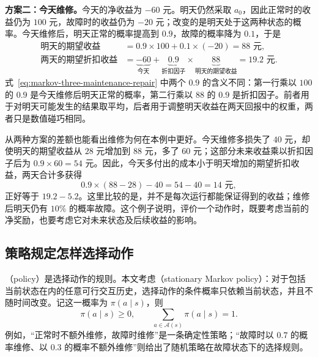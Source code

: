 \documentclass[UTF8]{ctexart}
\begin{document}
\begin{example}[维修的短期成本与后续收益]
\textbf{方案二：今天维修。}今天的净收益为 $-60$ 元。明天仍然采取 $a_0$，因此正常时的收益仍为 $100$ 元，故障时的收益仍为 $-20$ 元；改变的是明天处于这两种状态的概率。今天维修后，明天正常的概率提高到 $0.9$，故障的概率降为 $0.1$，于是
\begin{equation}
  \begin{aligned}
    \text{明天的期望收益}
      &=0.9\times100+0.1\times(-20)=88\text{ 元},\\
    \text{两天的期望折扣收益}
      &=\underbrace{-60}_{\text{今天}}
        +\underbrace{0.9}_{\text{折扣因子}}\times
         \underbrace{88}_{\text{明天的期望收益}}
        =19.2\text{ 元}.
  \end{aligned}
  \label{eq:markov-three-maintenance-repair}
\end{equation}
式~\eqref{eq:markov-three-maintenance-repair} 中两个 $0.9$ 的含义不同：第一行乘以 $100$ 的 $0.9$ 是今天维修后明天正常的概率，第二行乘以 $88$ 的 $0.9$ 是折扣因子。前者用于对明天可能发生的结果取平均，后者用于调整明天收益在两天回报中的权重，两者只是数值碰巧相同。

从两种方案的差额也能看出维修为何在本例中更好。今天维修多损失了 $40$ 元，却使明天的期望收益从 $28$ 元增加到 $88$ 元，多了 $60$ 元；这部分未来收益乘以折扣因子后为 $0.9\times60=54$ 元。因此，今天多付出的成本小于明天增加的期望折扣收益，两天合计多获得
\begin{equation}
  0.9\times(88-28)-40=54-40=14\text{ 元},
  \label{eq:markov-three-maintenance-gain}
\end{equation}
正好等于 $19.2-5.2$。这里比较的是，并不是每次运行都能保证得到的收益；维修后明天仍有 $10\%$ 的概率故障。这个例子说明，评价一个动作时，既要考虑当前的净奖励，也要考虑它对未来状态及后续收益的影响。
\end{example}

\subsection{策略规定怎样选择动作}

（policy）是选择动作的规则。本文考虑（stationary Markov policy）：对于包括当前状态在内的任意可行交互历史，选择动作的条件概率只依赖当前状态，并且不随时间改变。记这一概率为 $\pi(a\mid s)$，则
\[
  \pi(a\mid s)\geq0,\qquad
  \sum_{a\in\mathcal A(s)}\pi(a\mid s)=1.
\]
例如，“正常时不额外维修，故障时维修”是一条确定性策略；“故障时以 $0.7$ 的概率维修、以 $0.3$ 的概率不额外维修”则给出了随机策略在故障状态下的选择规则。
\end{document}
